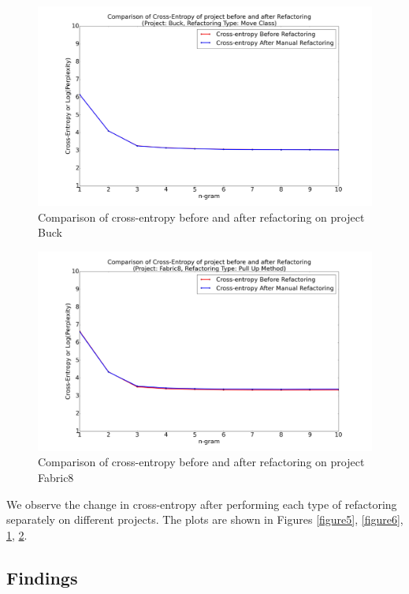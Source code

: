 \documentclass[conference]{IEEEtran}
\begin{document}
\begin{figure}[ht!]
\centering
\includegraphics[width=150mm]{../Result/Refactoring_MoveClass/Plot/buck.png}
\caption{Comparison of cross-entropy before and after refactoring on project Buck}
\label{figure7}
\end{figure}
\begin{figure}[ht!]
\centering
\includegraphics[width=150mm]{../Result/Refactoring_PullUpMethod/Plot/Fabric8.png}
\caption{Comparison of cross-entropy before and after refactoring on project Fabric8}
\label{figure8}
\end{figure}


We observe the change in cross-entropy after performing each type of refactoring separately on different projects. The plots are shown in Figures \ref{figure5}, \ref{figure6}, \ref{figure7}, \ref{figure8}.



\subsection{Findings}
\end{document}
